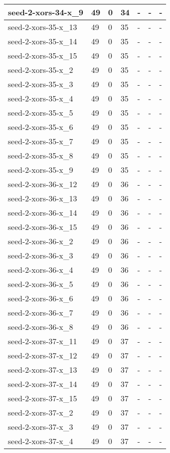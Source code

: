 \begin{scriptsize}
\begin{longtable}{|p{5cm}|l|l|l|l|l|l|}
seed-2-xors-34-x\_9&49&0&34&-&-&- \\ \hline 
seed-2-xors-35-x\_13&49&0&35&-&-&- \\ \hline 
seed-2-xors-35-x\_14&49&0&35&-&-&- \\ \hline 
seed-2-xors-35-x\_15&49&0&35&-&-&- \\ \hline 
seed-2-xors-35-x\_2&49&0&35&-&-&- \\ \hline 
seed-2-xors-35-x\_3&49&0&35&-&-&- \\ \hline 
seed-2-xors-35-x\_4&49&0&35&-&-&- \\ \hline 
seed-2-xors-35-x\_5&49&0&35&-&-&- \\ \hline 
seed-2-xors-35-x\_6&49&0&35&-&-&- \\ \hline 
seed-2-xors-35-x\_7&49&0&35&-&-&- \\ \hline 
seed-2-xors-35-x\_8&49&0&35&-&-&- \\ \hline 
seed-2-xors-35-x\_9&49&0&35&-&-&- \\ \hline 
seed-2-xors-36-x\_12&49&0&36&-&-&- \\ \hline 
seed-2-xors-36-x\_13&49&0&36&-&-&- \\ \hline 
seed-2-xors-36-x\_14&49&0&36&-&-&- \\ \hline 
seed-2-xors-36-x\_15&49&0&36&-&-&- \\ \hline 
seed-2-xors-36-x\_2&49&0&36&-&-&- \\ \hline 
seed-2-xors-36-x\_3&49&0&36&-&-&- \\ \hline 
seed-2-xors-36-x\_4&49&0&36&-&-&- \\ \hline 
seed-2-xors-36-x\_5&49&0&36&-&-&- \\ \hline 
seed-2-xors-36-x\_6&49&0&36&-&-&- \\ \hline 
seed-2-xors-36-x\_7&49&0&36&-&-&- \\ \hline 
seed-2-xors-36-x\_8&49&0&36&-&-&- \\ \hline 
seed-2-xors-37-x\_11&49&0&37&-&-&- \\ \hline 
seed-2-xors-37-x\_12&49&0&37&-&-&- \\ \hline 
seed-2-xors-37-x\_13&49&0&37&-&-&- \\ \hline 
seed-2-xors-37-x\_14&49&0&37&-&-&- \\ \hline 
seed-2-xors-37-x\_15&49&0&37&-&-&- \\ \hline 
seed-2-xors-37-x\_2&49&0&37&-&-&- \\ \hline 
seed-2-xors-37-x\_3&49&0&37&-&-&- \\ \hline 
seed-2-xors-37-x\_4&49&0&37&-&-&- \\ \hline 

\end{longtable}
\end{scriptsize}
